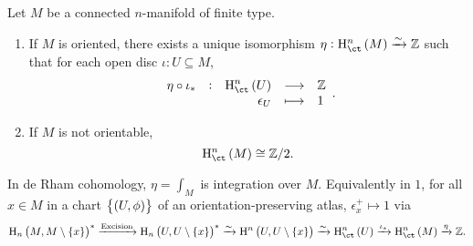 \begin{theorem}
Let $ M $ be a connected $ n $-manifold of finite type.
\begin{enumerate}
\item If $ M $ is oriented, there exists a unique isomorphism $ \eta : \Hc^n\br{M} \xrightarrow{\sim} \ZZ $ such that for each open disc $ \iota : U \subseteq M $,
$$ \function[\eta \circ \iota_*]{\Hc^n\br{U}}{\ZZ}{\epsilon_U}{1}. $$
\item If $ M $ is not orientable,
$$ \Hc^n\br{M} \cong \ZZ / 2. $$
\end{enumerate}
\end{theorem}

In de Rham cohomology, $ \eta = \int_M $ is integration over $ M $. Equivalently in $ 1 $, for all $ x \in M $ in a chart $ \cbr{\br{U, \phi}} $ of an orientation-preserving atlas, $ \epsilon_x^+ \mapsto 1 $ via
$$ \H_n\br{M, M \setminus \cbr{x}}^* \xrightarrow{\text{Excision}} \H_n\br{U, U \setminus \cbr{x}}^* \xrightarrow{\sim} \H^n\br{U, U \setminus \cbr{x}} \xrightarrow{\sim} \Hc^n\br{U} \xrightarrow{\iota_*} \Hc^n\br{M} \xrightarrow{\eta} \ZZ. $$

